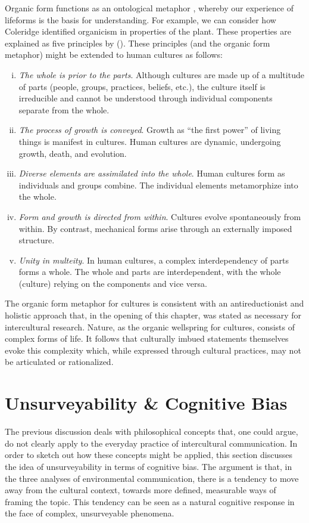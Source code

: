 Organic form functions as an ontological metaphor \cite[25]{Lakoff1980a}, whereby our experience of lifeforms is the basis for understanding. For example, we can consider how Coleridge identified organicism in properties of the plant. These properties are explained as five principles by \citeauthor{Abrams1953a} (\citeyear[170-75]{Abrams1953a}). These principles (and the organic form metaphor) might be extended to human cultures as follows:

\begin{enumerate}[i.]
  \item \textit{The whole is prior to the parts}. Although cultures are made up of a multitude of parts (people, groups, practices, beliefs, etc.), the culture itself is irreducible and cannot be understood through individual components separate from the whole.
  \item \textit{The process of growth is conveyed}. Growth as ``the first power'' of living things is manifest in cultures. Human cultures are dynamic, undergoing growth, death, and evolution. 
  \item \textit{Diverse elements are assimilated into the whole}. Human cultures form as individuals and groups combine. The individual elements metamorphize into the whole.
  \item \textit{Form and growth is directed from within}. Cultures evolve spontaneously from within. By contrast, mechanical forms arise through an externally imposed structure.
  \item \textit{Unity in multeity}. In human cultures, a complex interdependency of parts forms a whole. The whole and parts are interdependent, with the whole (culture) relying on the components and vice versa. 
\end{enumerate}

The organic form metaphor for cultures is consistent with an antireductionist and holistic approach that, in the opening of this chapter, was stated as necessary for intercultural research. Nature, as the organic wellspring for cultures, consists of complex forms of life. It follows that culturally imbued statements themselves evoke this complexity which, while expressed through cultural practices, may not be articulated or rationalized.	

\section{Unsurveyability \& Cognitive Bias}
 
The previous discussion deals with philosophical concepts that, one could argue, do not clearly apply to the everyday practice of intercultural communication. In order to sketch out how these concepts might be applied, this section discusses the idea of unsurveyability in terms of cognitive bias. The argument is that, in the three analyses of environmental communication, there is a tendency to move away from the cultural context, towards more defined, measurable ways of framing the topic. This tendency can be seen as a natural cognitive response in the face of complex, unsurveyable phenomena.   

